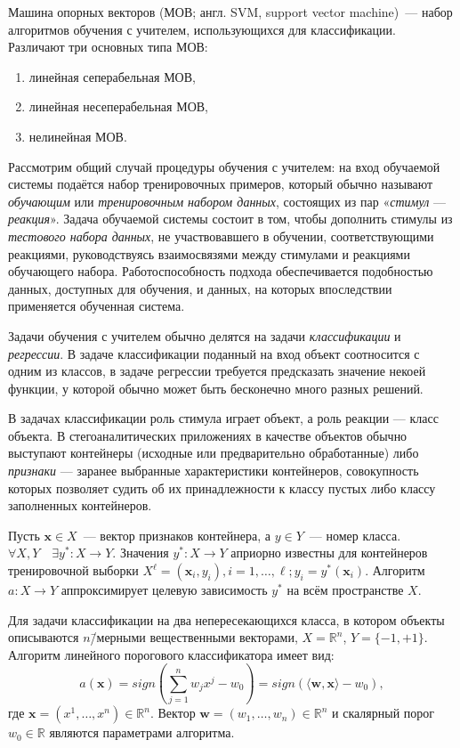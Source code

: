 Машина опорных векторов (МОВ; англ. SVM, support vector machine)~--- набор алгоритмов обучения с учителем, использующихся для классификации. Различают три основных типа МОВ:
\begin{enumerate}
\item линейная сеперабельная МОВ,
\item линейная несеперабельная МОВ,
\item нелинейная МОВ.
\end{enumerate}

Рассмотрим общий случай процедуры обучения с учителем: на вход обучаемой системы подаётся набор тренировочных примеров, который обычно называют \textit{обучающим} или \textit{тренировочным набором данных}, состоящих из пар «\textit{стимул} --- \textit{реакция}». Задача обучаемой системы состоит в том, чтобы дополнить стимулы из \textit{тестового набора данных}, не участвовавшего в обучении, соответствующими реакциями, руководствуясь взаимосвязями между стимулами и реакциями обучающего набора. Работоспособность подхода обеспечивается подобностью данных, доступных для обучения, и данных, на которых впоследствии применяется обученная система.

Задачи обучения с учителем обычно делятся на задачи \textit{классификации} и \textit{регрессии}. В задаче классификации поданный на вход объект соотносится с одним из классов, в задаче регрессии требуется предсказать значение некоей функции, у которой обычно может быть бесконечно много разных решений.

В задачах классификации роль стимула играет объект, а роль реакции --- класс объекта. В стегоаналитических приложениях в качестве объектов обычно выступают контейнеры (исходные или предварительно обработанные) либо \textit{признаки} --- заранее выбранные характеристики контейнеров, совокупность которых позволяет судить об их принадлежности к классу пустых либо классу заполненных контейнеров.

Пусть $ \boldsymbol{x} \in X $~--- вектор признаков контейнера, а $ y \in Y $~--- номер класса. $ \forall X, Y \quad \exists y^*: X \to Y. $ Значения $ y^*: X \to Y $ априорно известны для контейнеров тренировочной выборки $ X^\ell = (\boldsymbol{x}_i, y_i), i = 1, \ldots, \ell; y_i = y^*(\boldsymbol{x}_i) $. Алгоритм $ a: X \to Y $ аппроксимирует целевую зависимость $ y^* $ на всём пространстве $ X $.

Для задачи классификации на два непересекающихся класса, в котором объекты описываются $ n $\=/мерными вещественными векторами, $ X = \mathbb{R}^n $, $ Y = \{-1, +1\} $. Алгоритм линейного порогового классификатора имеет вид:
\begin{equation*}
a(\boldsymbol{x}) = sign(\sum_{j = 1}^n w_j x^j - w_0) = sign(\langle \boldsymbol{w}, \boldsymbol{x} \rangle - w_0),
\end{equation*}
где $ \boldsymbol{x} = (x^1, \ldots, x^n) \in \mathbb{R}^n $. Вектор $ \boldsymbol{w} = (w_1, \ldots, w_n) \in \mathbb{R}^n $ и скалярный порог $ w_0 \in \mathbb{R} $ являются параметрами алгоритма.

